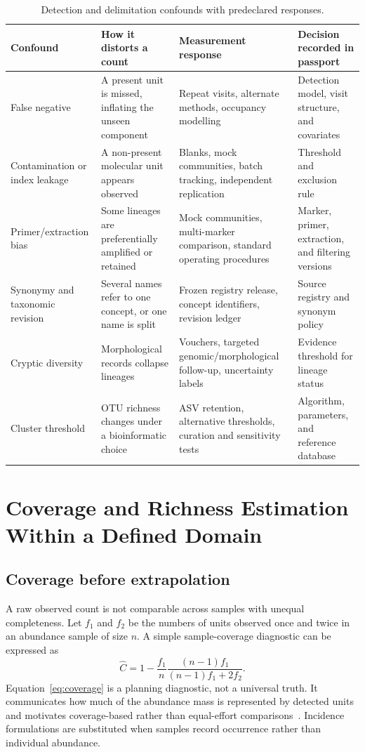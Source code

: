 \documentclass[conference]{IEEEtran}
\begin{document}
\begin{table}[t]
\caption{Detection and delimitation confounds with predeclared responses.}
\label{tab:confounds}
\centering
\footnotesize
\begin{tabular}{L{0.18\textwidth} L{0.25\textwidth} L{0.27\textwidth} L{0.22\textwidth}}
\toprule
\textbf{Confound} & \textbf{How it distorts a count} & \textbf{Measurement response} & \textbf{Decision recorded in passport}\\
\midrule
False negative & A present unit is missed, inflating the unseen component & Repeat visits, alternate methods, occupancy modelling & Detection model, visit structure, and covariates\\
Contamination or index leakage & A non-present molecular unit appears observed & Blanks, mock communities, batch tracking, independent replication & Threshold and exclusion rule\\
Primer/extraction bias & Some lineages are preferentially amplified or retained & Mock communities, multi-marker comparison, standard operating procedures & Marker, primer, extraction, and filtering versions\\
Synonymy and taxonomic revision & Several names refer to one concept, or one name is split & Frozen registry release, concept identifiers, revision ledger & Source registry and synonym policy\\
Cryptic diversity & Morphological records collapse lineages & Vouchers, targeted genomic/morphological follow-up, uncertainty labels & Evidence threshold for lineage status\\
Cluster threshold & OTU richness changes under a bioinformatic choice & ASV retention, alternative thresholds, curation and sensitivity tests & Algorithm, parameters, and reference database\\
\bottomrule
\end{tabular}
\end{table}

\section{Coverage and Richness Estimation Within a Defined Domain}

\subsection{Coverage before extrapolation}

A raw observed count is not comparable across samples with unequal completeness. Let $f_1$ and $f_2$ be the numbers of units observed once and twice in an abundance sample of size $n$. A simple sample-coverage diagnostic can be expressed as
\begin{equation}
\widehat{C}=1-\frac{f_1}{n}\frac{(n-1)f_1}{(n-1)f_1+2f_2}.
\label{eq:coverage}
\end{equation}
Equation~\eqref{eq:coverage} is a planning diagnostic, not a universal truth. It communicates how much of the abundance mass is represented by detected units and motivates coverage-based rather than equal-effort comparisons~\cite{chao2012}. Incidence formulations are substituted when samples record occurrence rather than individual abundance.
\end{document}
